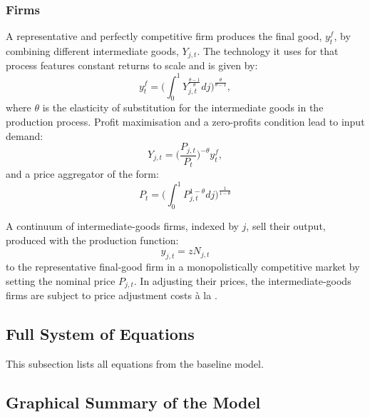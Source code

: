 \documentclass[a4paper,12pt]{article} %
\numberwithin{equation}{section} %
\numberwithin{figure}{section}
\numberwithin{table}{section}
\begin{document}
\begin{refsection}
\begin{appendices}
\subsubsection{Firms}
\label{sec-app:full-derivations-firms}
A representative and perfectly competitive firm produces the final good, $y_t^f$, by combining different intermediate goods, $Y_{j,t}$. The technology it uses for that process features constant returns to scale and is given by:
\begin{equation}
    y_t^f = \Bigg( \int_0^1 Y_{j,t}^{\frac{\theta - 1}{\theta}} dj \Bigg)^{\frac{\theta}{\theta-1}},
\end{equation}
where $\theta$ is the elasticity of substitution for the intermediate goods in the production process. Profit maximisation and a zero-profits condition lead to input demand:
\begin{equation}
    Y_{j,t} = \Bigg( \frac{P_{j,t}}{P_t} \Bigg)^{-\theta} y_t^f,
\end{equation}
and a price aggregator of the form:
\begin{equation}
    P_t = \Bigg( \int_0^1 P_{j,t}^{1-\theta} dj \Bigg)^{\frac{1}{1-\theta}}
\end{equation}

A continuum of intermediate-goods firms, indexed by $j$, sell their output, produced with the production function:
\begin{equation}
    y_{j,t} = z N_{j,t}
\end{equation}
to the representative final-good firm in a monopolistically competitive market by setting the nominal price $P_{j,t}$. In adjusting their prices, the intermediate-goods firms are subject to price adjustment costs à la \textcite{rotemberg1982}.

\subsection{Full System of Equations}
\label{sec-app:full-equations}

This subsection lists all equations from the baseline model.

\subsection{Graphical Summary of the Model}
\label{sec-app:full-graphical}


\end{appendices}
\end{refsection}
\end{document}
